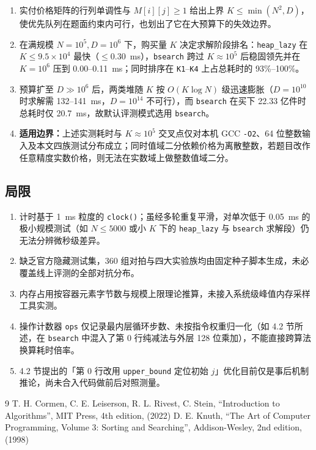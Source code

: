 \documentclass[12pt,a4paper,fontset=windows]{ctexart}
\theoremstyle{plain}
\newcommand{\code}[1]{\texttt{#1}}
\begin{document}
\begin{enumerate}[leftmargin=1.8em,itemsep=0.18em,topsep=0.18em]
  \item 实付价格矩阵的行列单调性与 $M[i][j] \ge 1$ 给出上界 $K \le \min(N^2, D)$，使优先队列在题面约束内可行，也划出了它在大预算下的失效边界。
  \item 在满规模 $N=10^5, D=10^6$ 下，购买量 $K$ 决定求解阶段排名：\code{heap\_lazy} 在 $K \le 9.5\times 10^4$ 最快（$\le 0.30$~ms），\code{bsearch} 跨过 $K \approx 10^5$ 后稳固领先并在 $K=10^6$ 压到 0.00--0.11~ms；同时排序在 \code{K1}--\code{K4} 上占总耗时的 93\%--100\%。
  \item 预算扩至 $D \gg 10^6$ 后，两类堆随 $K$ 按 $O(K\log N)$ 级迅速膨胀（$D=10^{10}$ 时求解需 132--141~ms，$D=10^{14}$ 不可行），而 \code{bsearch} 在买下 22.33 亿件时总耗时仅 20.7~ms，故默认评测模式选用 \code{bsearch}。
  \item \textbf{适用边界：}上述实测耗时与 $K \approx 10^5$ 交叉点仅对本机 GCC \code{-O2}、64 位整数输入及本文四族测试分布成立；同时值域二分依赖价格为离散整数，若题目改作任意精度实数价格，则无法在实数域上做整数值域二分。
\end{enumerate}

\subsection{局限}

\begin{enumerate}[leftmargin=1.8em,itemsep=0.18em,topsep=0.18em]
  \item 计时基于 1~ms 粒度的 \code{clock()}；虽经多轮重复平滑，对单次低于 0.05~ms 的极小规模测试（如 $N \le 5000$ 或小 $K$ 下的 \code{heap\_lazy} 与 \code{bsearch} 求解段）仍无法分辨微秒级差异。
  \item 缺乏官方隐藏测试集，360 组对拍与四大实验族均由固定种子脚本生成，未必覆盖线上评测的全部对抗分布。
  \item 内存占用按容器元素字节数与规模上限理论推算，未接入系统级峰值内存采样工具实测。
  \item 操作计数器 \code{ops} 仅记录最内层循环步数、未按指令权重归一化（如 4.2 节所述，在 \code{bsearch} 中混入了第 0 行纯减法与外层 128 位乘加），不能直接跨算法换算耗时倍率。
  \item 4.2 节提出的「第 0 行改用 \code{upper\_bound} 定位初始 $j$」优化目前仅是事后机制推论，尚未合入代码做前后对照测量。
\end{enumerate}

\renewcommand{\refname}{References}
\begin{thebibliography}{9}
\small
\setlength{\itemsep}{2pt}
 T. H. Cormen, C. E. Leiserson, R. L. Rivest, C. Stein, ``Introduction to Algorithms'', MIT Press, 4th edition, (2022)
 D. E. Knuth, ``The Art of Computer Programming, Volume 3: Sorting and Searching'', Addison-Wesley, 2nd edition, (1998)
\end{thebibliography}
\end{document}
